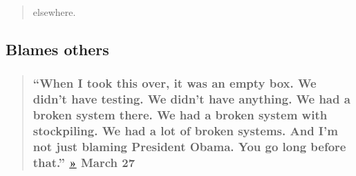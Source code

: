 \begin{quote}
elsewhere.
\end{quote}

\hypertarget{blames-others}{%
\subsection{Blames others}\label{blames-others}}

\begin{quote}
\hypertarget{when-i-took-this-over-it-was-an-empty-box-we-didnt-have-testing-we-didnt-have-anything-we-had-a-broken-system-there-we-had-a-broken-system-with-stockpiling-we-had-a-lot-of-broken-systems-and-im-not-just-blaming-president-obama-you-go-long-before-that--march-27}{%
\subsubsection{\texorpdfstring{``When I took this over, it was an empty
box. We didn't have testing. We didn't have anything. We had a broken
system there. We had a broken system with stockpiling. We had a lot of
broken systems. And I'm not just blaming President Obama. You go long
before that.''
\href{https://www.whitehouse.gov/briefings-statements/remarks-president-trump-vice-president-pence-members-coronavirus-task-force-press-briefing-13/}{»}
\textbf{March
27}}{``When I took this over, it was an empty box. We didn't have testing. We didn't have anything. We had a broken system there. We had a broken system with stockpiling. We had a lot of broken systems. And I'm not just blaming President Obama. You go long before that.'' » March 27}}\label{when-i-took-this-over-it-was-an-empty-box-we-didnt-have-testing-we-didnt-have-anything-we-had-a-broken-system-there-we-had-a-broken-system-with-stockpiling-we-had-a-lot-of-broken-systems-and-im-not-just-blaming-president-obama-you-go-long-before-that--march-27}}
\end{quote}

